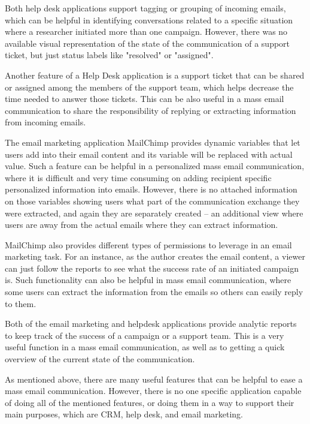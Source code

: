 \begin{compactitem}
	\item Both help desk applications support tagging or grouping of incoming emails, which can be helpful in identifying conversations related to a specific situation where a researcher initiated more than one campaign. However, there was no available visual representation of the state of the communication of a support ticket, but just status labels like "resolved" or "assigned".
	\item Another feature of a Help Desk application is a support ticket that can be shared or assigned among the members of the support team, which helps decrease the time needed to answer those tickets. This can be also useful in a mass email communication to share the responsibility of replying or extracting information from incoming emails.
	\item The email marketing application MailChimp provides dynamic variables that let users add into their email content and its variable will be replaced with actual value. Such a feature can be helpful in a personalized mass email communication, where it is difficult and very time consuming on adding recipient specific personalized information into emails. However, there is no attached information on those variables showing users what part of the communication exchange they were extracted, and again they are separately created -- an additional view where users are away from the actual emails where they can extract information.
	\item MailChimp also provides different types of permissions to leverage in an email marketing task. For an instance, as the author creates the email content, a viewer can just follow the reports to see what the success rate of an initiated campaign is. Such functionality can also be helpful in mass email communication, where some users can extract the information from the emails so others can easily reply to them.
	\item Both of the email marketing and helpdesk applications provide analytic reports to keep track of the success of a campaign or a support team. This is a very useful function in a mass email communication, as well as to getting a quick overview of the current state of the communication.
\end{compactitem}

As mentioned above, there are many useful features that can be helpful to ease a mass email communication. However, there is no one specific application capable of doing all of the mentioned features, or doing them in a way to support their main purposes, which are \ac{CRM}, help desk, and email marketing.

